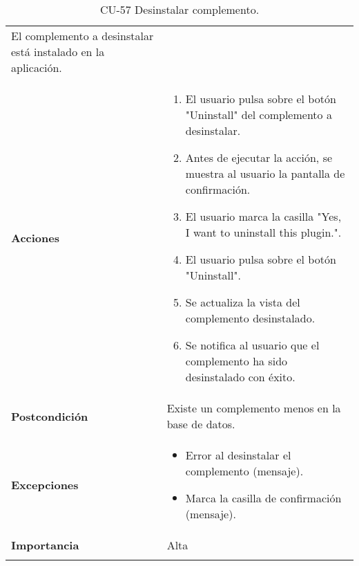 \begin{longtable}[]{@{}ll@{}}
\begin{minipage}[t]{0.72\columnwidth}
El complemento a desinstalar está instalado en la aplicación.\strut
\end{minipage}\tabularnewline
\begin{minipage}[t]{0.22\columnwidth}\raggedright
\textbf{Acciones}\strut
\end{minipage} & \begin{minipage}[t]{0.72\columnwidth}\raggedright
\begin{enumerate}
\def\labelenumi{\arabic{enumi}.}
\tightlist
\item
  El usuario pulsa sobre el botón "Uninstall" del complemento a
  desinstalar.
\item
  Antes de ejecutar la acción, se muestra al usuario la pantalla de
  confirmación.
\item
  El usuario marca la casilla "Yes, I want to uninstall this plugin.".
\item
  El usuario pulsa sobre el botón "Uninstall".
\item
  Se actualiza la vista del complemento desinstalado.
\item
  Se notifica al usuario que el complemento ha sido desinstalado con
  éxito.
\end{enumerate}\strut
\end{minipage}\tabularnewline
\begin{minipage}[t]{0.22\columnwidth}\raggedright
\textbf{Postcondición}\strut
\end{minipage} & \begin{minipage}[t]{0.72\columnwidth}\raggedright
Existe un complemento menos en la base de datos.\strut
\end{minipage}\tabularnewline
\begin{minipage}[t]{0.22\columnwidth}\raggedright
\textbf{Excepciones}\strut
\end{minipage} & \begin{minipage}[t]{0.72\columnwidth}\raggedright
\begin{itemize}
\tightlist
\item
  Error al desinstalar el complemento (mensaje).
\item
  Marca la casilla de confirmación (mensaje).
\end{itemize}\strut
\end{minipage}\tabularnewline
\begin{minipage}[t]{0.22\columnwidth}\raggedright
\textbf{Importancia}\strut
\end{minipage} & \begin{minipage}[t]{0.72\columnwidth}\raggedright
Alta\strut
\end{minipage}\tabularnewline
\bottomrule
\caption{CU-57 Desinstalar complemento.}
\end{longtable}

